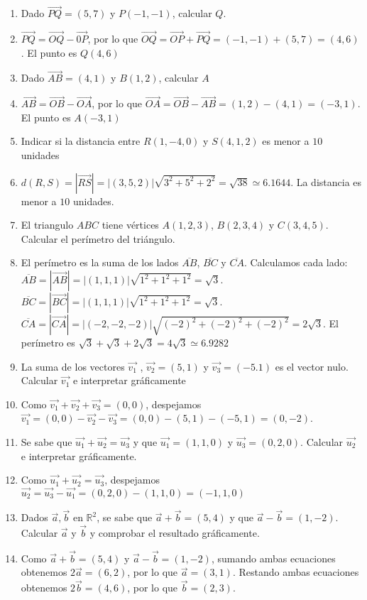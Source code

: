 \documentclass[a4paper]{article}
\newcommand{\answer}{\item[**]}
\newcommand{\vect}[1]{\overrightarrow{#1}}
\begin{document}
\begin{enumerate}
\begin{enumerate} [label=(\alph*)]
		\item Dado $\vect{PQ}=(5,7)$ y $P(-1,-1)$, calcular $Q$.
		\answer $\vect{PQ} = \vect{OQ} - \vect{0P}$, por lo que $\vect{OQ}=\vect{OP}+\vect{PQ}=(-1,-1)+(5,7)=(4,6)$. El punto es $Q(4,6)$

		\item Dado $\vect{AB}=(4,1)$ y $B(1,2)$, calcular $A$
		\answer $\vect{AB} = \vect{OB} - \vect{OA}$, por lo que $\vect{OA}=\vect{OB}-\vect{AB}=(1,2)-(4,1)=(-3,1)$. El punto es $A(-3,1)$

		\item Indicar si la distancia entre $R(1,-4,0)$ y $S(4,1,2)$ es menor a $10$ unidades
		\answer $d(R,S) = \left| \vect{RS} \right| = \left| (3,5,2) \right| \sqrt{3^2+5^2+2^2} = \sqrt{38} \simeq 6.1644$. La distancia es menor a $10$ unidades.

		\item El triangulo $ABC$ tiene vértices $A(1,2,3)$, $B(2,3,4)$ y $C(3,4,5)$. Calcular el perímetro del triángulo.
		\answer El perímetro es la suma de los lados $\overline{AB}$, $\overline{BC}$ y $\overline{CA}$. Calculamos cada lado: \\ $\overline{AB} = \left| \vect{AB}\right| = \left| (1,1,1) \right| \sqrt{1^2+1^2+1^2} = \sqrt{3}$. \\ $\overline{BC} = \left| \vect{BC}\right| = \left| (1,1,1) \right| \sqrt{1^2+1^2+1^2} = \sqrt{3}$. $\overline{CA} = \left| \vect{CA}\right| = \left| (-2,-2,-2) \right| \sqrt{(-2)^2+(-2)^2+(-2)^2} = 2\sqrt{3}$. El perímetro es $\sqrt{3}+\sqrt{3}+2\sqrt{3} = 4\sqrt{3} \simeq 6.9282$

		\item La suma de los vectores $\vect{v_1}$ , $\vect{v_2}=(5,1)$ y $\vect{v_3} = (-5.1)$ es el vector nulo. Calcular $\vect{v_1}$ e interpretar gráficamente
		\answer Como $\vect{v_1}+\vect{v_2}+\vect{v_3}=(0,0)$, despejamos $\vect{v_1} = (0,0) -\vect{v_2} - \vect{v_3} = (0,0) - (5,1) - (-5,1) = (0,-2)$.

		\item Se sabe que $\vect{u_1} + \vect{u_2} = \vect{u_3}$ y que $\vect{u_1} = (1,1,0)$ y $\vect{u_3}=(0,2,0)$. Calcular $\vect{u_2}$ e interpretar gráficamente.
		\answer Como $\vect{u_1} + \vect{u_2} = \vect{u_3}$, despejamos $\vect{u_2} = \vect{u_3} - \vect{u_1} = (0,2,0) - (1,1,0) = (-1,1,0)$

		\item Dados $\vec{a},\vec{b}$ en $\mathbb{R}^2$, se sabe que $\vec{a}+\vec{b}=(5,4)$ y que $\vec{a}-\vec{b}=(1,-2)$. Calcular $\vec{a}$ y $\vec{b}$ y comprobar el resultado gráficamente.
		\answer Como $\vec{a}+\vec{b}=(5,4)$ y $\vec{a}-\vec{b}=(1,-2)$, sumando ambas ecuaciones obtenemos $2\vec{a}=(6,2)$, por lo que $\vec{a}=(3,1)$. Restando ambas ecuaciones obtenemos $2\vec{b}=(4,6)$, por lo que $\vec{b}=(2,3)$.


\end{enumerate}
\end{enumerate}
\end{document}
